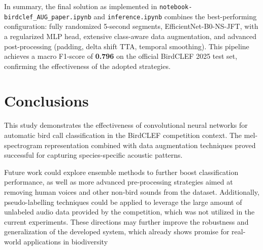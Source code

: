 \documentclass[ERTS, 2025]{ERTS}
\begin{document}
\noindent
In summary, the final solution as implemented in \linebreak\texttt{notebook-birdclef\_AUG\_paper.ipynb} and \linebreak\texttt{inference.ipynb} combines the best-performing configuration: fully randomized 5-second segments, EfficientNet-B0-NS-JFT, with a regularized MLP head, extensive class-aware data augmentation, and advanced post-processing (padding, delta shift TTA, temporal smoothing). This pipeline achieves a macro F1-score of \textbf{0.796} on the official BirdCLEF 2025 test set, confirming the effectiveness of the adopted strategies.

\section{Conclusions}
This study demonstrates the effectiveness of convolutional neural networks for automatic bird call classification in the BirdCLEF competition context. The mel-spectrogram representation combined with data augmentation techniques proved successful for capturing species-specific acoustic patterns.

Future work could explore ensemble methods to further boost classification performance, as well as more advanced pre-processing strategies aimed at removing human voices and other non-bird sounds from the dataset. Additionally, pseudo-labelling techniques could be applied to leverage the large amount of unlabeled audio data provided by the competition, which was not utilized in the current experiments. These directions may further improve the robustness and generalization of the developed system, which already shows promise for real-world applications in biodiversity

\clearpage
\onecolumn
\end{document}
